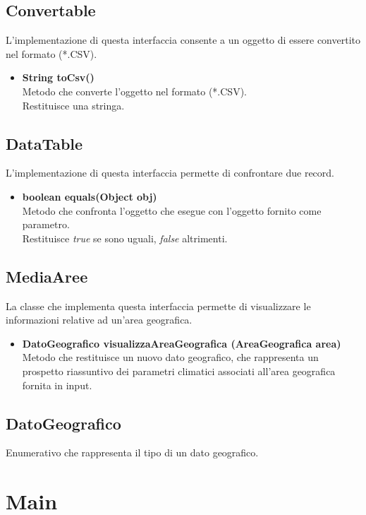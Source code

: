 \documentclass[a4paper, 12pt]{scrreprt}
\begin{document}
			\subsection{Convertable}
			L'implementazione di questa interfaccia consente a un oggetto di essere convertito nel formato (*.CSV).
			\begin{itemize}
				\item \textbf{String toCsv()}
				\\Metodo che converte l'oggetto nel formato (*.CSV).
				\\Restituisce una stringa.
			\end{itemize}
			\subsection{DataTable}
			L'implementazione di questa interfaccia permette di confrontare due record.
			\begin{itemize}
				\item\textbf{boolean equals(Object obj)}
				\\Metodo che confronta l'oggetto che esegue con l'oggetto fornito come parametro.
				\\Restituisce \textit{true} se sono uguali, \textit{false} altrimenti.
			\end{itemize}
			\subsection{MediaAree}
			La classe che implementa questa interfaccia permette di visualizzare le informazioni relative ad un'area geografica.
			\begin{itemize}
				\item\textbf {DatoGeografico visualizzaAreaGeografica (AreaGeografica area)}
				\\Metodo che restituisce un nuovo dato geografico, che rappresenta un prospetto riassuntivo dei parametri climatici associati all'area geografica fornita in input.
			\end{itemize}
			\subsection{DatoGeografico}
			Enumerativo che rappresenta il tipo di un dato geografico.


		\section{Main}

	\nocite{IuriTex}
	
	
	\printindex
\end{document}
